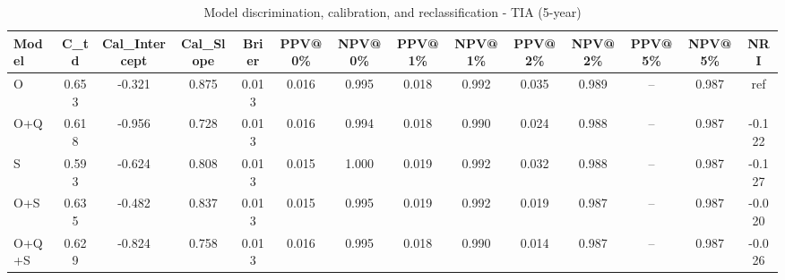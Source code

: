 \begin{table}[htbp]
\centering
\small
\caption{Model discrimination, calibration, and reclassification - TIA (5-year)}
\label{tab:perf_tia_5y}
\begin{tabular}{lccccccccccccc}
\toprule
Model & C\_td & Cal\_Intercept & Cal\_Slope & Brier & PPV@0\% & NPV@0\% & PPV@1\% & NPV@1\% & PPV@2\% & NPV@2\% & PPV@5\% & NPV@5\% & NRI \\
\midrule
O & 0.653 & -0.321 & 0.875 & 0.013 & 0.016 & 0.995 & 0.018 & 0.992 & 0.035 & 0.989 & -- & 0.987 & ref \\
O+Q & 0.618 & -0.956 & 0.728 & 0.013 & 0.016 & 0.994 & 0.018 & 0.990 & 0.024 & 0.988 & -- & 0.987 & -0.122 \\
S & 0.593 & -0.624 & 0.808 & 0.013 & 0.015 & 1.000 & 0.019 & 0.992 & 0.032 & 0.988 & -- & 0.987 & -0.127 \\
O+S & 0.635 & -0.482 & 0.837 & 0.013 & 0.015 & 0.995 & 0.019 & 0.992 & 0.019 & 0.987 & -- & 0.987 & -0.020 \\
O+Q+S & 0.629 & -0.824 & 0.758 & 0.013 & 0.016 & 0.995 & 0.018 & 0.990 & 0.014 & 0.987 & -- & 0.987 & -0.026 \\
\bottomrule
\end{tabular}
\end{table}